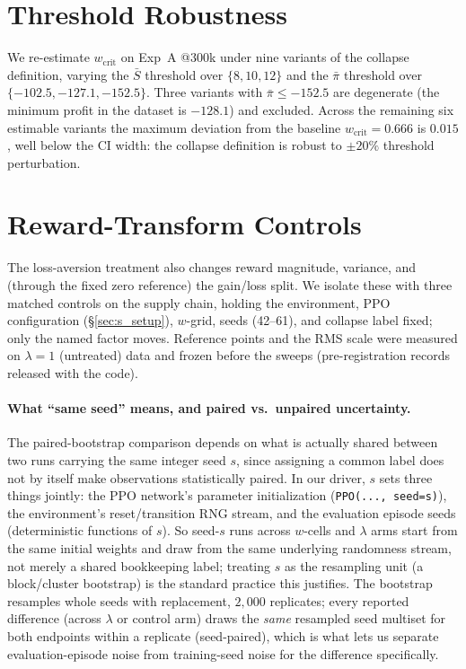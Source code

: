 \documentclass[letterpaper]{article} %
\theoremstyle{plain}
\newcommand{\wcrit}{w_{\mathrm{crit}}}
\begin{document}
\section{Threshold Robustness}
\label{sec:s_robustness}

We re-estimate $\wcrit$ on Exp~A @300k under nine variants of the collapse definition, varying
the $\bar S$ threshold over $\{8,10,12\}$ and the $\bar\pi$ threshold over
$\{-102.5,-127.1,-152.5\}$. Three variants with $\bar\pi\le-152.5$ are degenerate (the minimum
profit in the dataset is $-128.1$) and excluded. Across the remaining six estimable variants
the maximum deviation from the baseline $\wcrit=0.666$ is $0.015$, well below the CI width: the
collapse definition is robust to $\pm20\%$ threshold perturbation.

\section{Reward-Transform Controls}
\label{sec:s_controls}
The loss-aversion treatment also changes reward magnitude, variance, and (through the fixed zero
reference) the gain/loss split. We isolate these with three matched controls on the supply chain,
holding the environment, PPO configuration (\S\ref{sec:s_setup}), $w$-grid, seeds (42--61), and
collapse label fixed; only the named factor moves. Reference points and the RMS scale were measured
on $\lambda{=}1$ (untreated) data and frozen before the sweeps (pre-registration records released with
the code).

\paragraph{What ``same seed'' means, and paired vs.\ unpaired uncertainty.} The paired-bootstrap
comparison depends on what is actually shared between two runs carrying the same integer seed $s$, since assigning a
common label does not by itself make observations statistically paired. In our driver, $s$ sets three
things jointly: the PPO network's parameter initialization (\texttt{PPO(..., seed=s)}), the
environment's reset/transition RNG stream, and the evaluation episode seeds (deterministic functions
of $s$). So seed-$s$ runs across $w$-cells and $\lambda$ arms start from the same initial weights and
draw from the same underlying randomness stream, not merely a shared bookkeeping label; treating $s$ as
the resampling unit (a block/cluster bootstrap) is the standard practice this justifies. The bootstrap
resamples whole seeds with replacement, $2{,}000$ replicates; every reported difference (across
$\lambda$ or control arm) draws the \emph{same} resampled seed multiset for both endpoints within a
replicate (seed-paired), which is what lets us separate evaluation-episode noise from training-seed
noise for the difference specifically.
\end{document}
